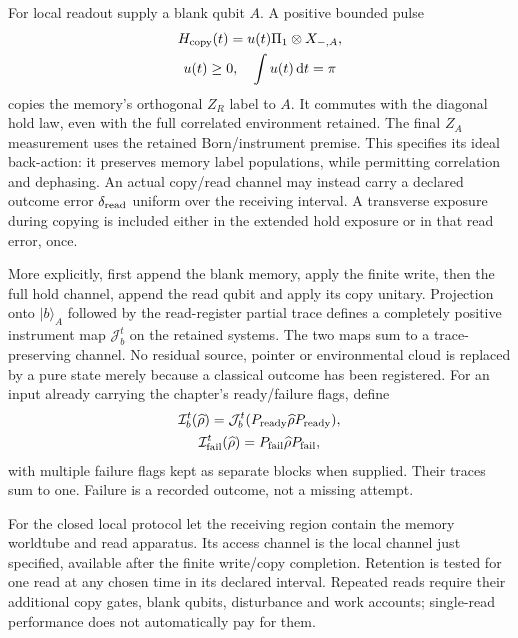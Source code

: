 For local readout supply a blank qubit $A$. A positive bounded pulse
\begin{equation}
\begin{gathered}
H_{\rm copy}(t)=u(t)\Pi_1\otimes X_{-,A},\\
 u(t)\geq0,\quad\int u(t)\,\mathrm dt=\pi
\end{gathered}
\label{eq:chvi-memory-read-copy}
\end{equation}
copies the memory's orthogonal $Z_R$ label to $A$. It commutes with the
diagonal hold law, even with the full correlated environment retained.
The final $Z_A$ measurement uses the retained Born/instrument premise.
This specifies its ideal back-action: it preserves memory label populations,
while permitting correlation and dephasing. An actual copy/read channel
may instead carry a declared outcome error $\delta_{\rm read}$ uniform over
the receiving interval. A transverse exposure during copying is included
either in the extended hold exposure or in that read error, once.

More explicitly, first append the blank memory, apply the finite write,
then the full hold channel, append the read qubit and apply its copy unitary.
Projection onto $|b\rangle_A$ followed by the read-register partial trace
defines a completely positive instrument map $\mathcal J_b^t$ on the
retained systems. The two maps sum to a trace-preserving channel.
No residual source, pointer or environmental cloud is replaced by a pure
state merely because a classical outcome has been registered.
For an input already carrying the chapter's ready/failure flags, define
\begin{equation}
\begin{gathered}
\mathcal I_b^t(\widehat\rho)
     =\mathcal J_b^t(P_{\rm ready}\widehat\rho P_{\rm ready}),
 \\
 \mathcal I_{\rm fail}^t(\widehat\rho)
     =P_{\rm fail}\widehat\rho P_{\rm fail},
\end{gathered}
\label{eq:chvi-memory-complete-instrument}
\end{equation}
with multiple failure flags kept as separate blocks when supplied. Their
traces sum to one. Failure is a recorded outcome, not a missing attempt.

For the closed local protocol let the receiving region contain the memory
worldtube and read apparatus. Its access channel is the local channel just
specified, available after the finite write/copy completion. Retention is
tested for one read at any chosen time in its declared interval. Repeated
reads require their additional copy gates, blank qubits, disturbance and
work accounts; single-read performance does not automatically pay for them.


